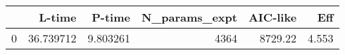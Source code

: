 \begin{tabular}{lrrrrr}
\toprule
{} &     L-time &    P-time &  N\_params\_expt &  AIC-like &    Eff \\
\midrule
0 &  36.739712 &  9.803261 &           4364 &   8729.22 &  4.553 \\
\bottomrule
\end{tabular}
